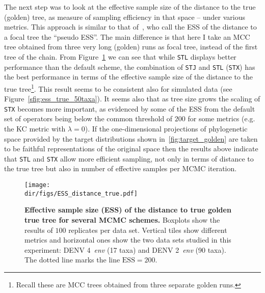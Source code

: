 The next step was to look at the effective sample size of the distance to the true (golden) tree, as measure of sampling efficiency in that space -- under various metrics.
This approach is similar to that of~\cite{Lanfear2016}, who call the ESS of the distance to a focal tree the ``pseudo ESS''.
The main difference is that here I take an MCC tree obtained from three very long (golden) runs as focal tree, instead of the first tree of the chain.
From Figure~\ref{fig:ESS_distance_true} we can see that while \verb|STL| displays better performance than the default scheme, the combination of \verb|STJ| and \verb|STL| (\verb|STX|) has the best performance in terms of the effective sample size of the distance to the true tree\footnote{Recall these are  MCC trees obtained from three separate golden runs.}.
This result seems to be consistent also for simulated data (see Figure~\ref{sfig:ess_true_50taxa}).
It seems also that as tree size grows the scaling of \verb|STX| becomes more important, as evidenced by some of the ESS from the default set of operators being below the common threshold of $200$ for some metrics (e.g. the KC metric with $\lambda = 0$).
If the one-dimensional projections of phylogenetic space provided by the target distributions shown in~\ref{fig:target_golden} are taken to be faithful representations of the original space then the results above indicate that \verb|STL| and \verb|STX|  allow more efficient sampling, not only in terms of distance to the true tree but also in number of effective samples per MCMC iteration.

\begin{figure}[!ht]
\begin{center}
\texttt{[image: \\dir/figs/ESS\_distance\_true.pdf]} 
\end{center}
 \caption[Effective sample size (ESS) of the distance to true golden true tree for several MCMC schemes.]{\textbf{Effective sample size (ESS) of the distance to true golden true tree for several MCMC schemes.}
   Boxplots show the results of $100$ replicates per data set.
  Vertical tiles show different metrics and horizontal ones show the two data sets studied in this experiment: DENV 4~\textit{env} (17 taxa) and DENV 2~\textit{env} (90 taxa).
  The dotted line marks the line $\text{ESS} = 200$.
  }
 \label{fig:ESS_distance_true}
\end{figure}

